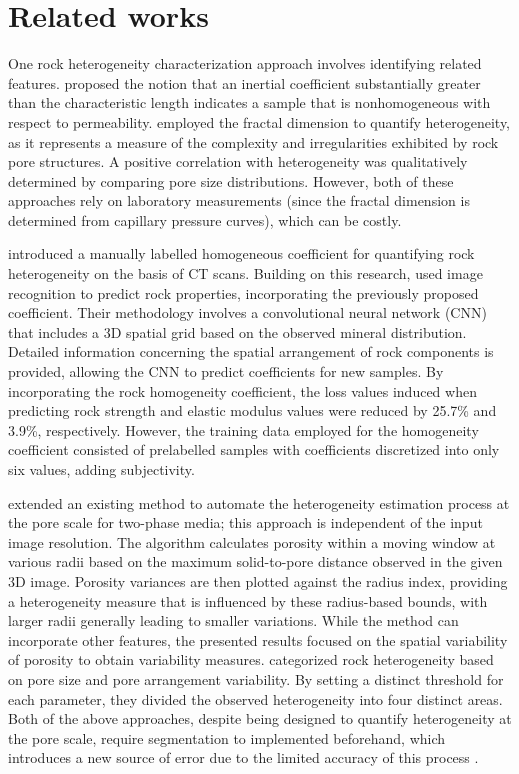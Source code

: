 \section{Related works}
\label{sec_related_works}

One rock heterogeneity characterization approach involves identifying related features. \citet{jones1987using} proposed the notion that an inertial coefficient substantially greater than the characteristic length indicates a sample that is nonhomogeneous with respect to permeability. \citet{li2004characterization} employed the fractal dimension to quantify heterogeneity, as it represents a measure of the complexity and irregularities exhibited by rock pore structures. A positive correlation with heterogeneity was qualitatively determined by comparing pore size distributions. However, both of these approaches rely on laboratory measurements (since the fractal dimension is determined from capillary pressure curves), which can be costly.

\citet{lin2021prediction} introduced a manually labelled homogeneous coefficient for quantifying rock heterogeneity on the basis of CT scans. Building on this research, \citet{tian2023quantification} used image recognition to predict rock properties, incorporating the previously proposed coefficient. Their methodology involves a convolutional neural network (CNN) that includes a 3D spatial grid based on the observed mineral distribution. Detailed information concerning the spatial arrangement of rock components is provided, allowing the CNN to predict coefficients for new samples. By incorporating the rock homogeneity coefficient, the loss values induced when predicting rock strength and elastic modulus values were reduced by 25.7\% and 3.9\%, respectively. However, the training data employed for the homogeneity coefficient consisted of prelabelled samples with coefficients discretized into only six values, adding subjectivity.

\citet{mohamed2023scale} extended an existing method to automate the heterogeneity estimation process at the pore scale for two-phase media; this approach is independent of the input image resolution. The algorithm calculates porosity within a moving window at various radii based on the maximum solid-to-pore distance observed in the given 3D image. Porosity variances are then plotted against the radius index, providing a heterogeneity measure that is influenced by these radius-based bounds, with larger radii generally leading to smaller variations. While the method can incorporate other features, the presented results focused on the spatial variability of porosity to obtain variability measures. \citet{yazynina2021new} categorized rock heterogeneity based on pore size and pore arrangement variability. By setting a distinct threshold for each parameter, they divided the observed heterogeneity into four distinct areas. Both of the above approaches, despite being designed to quantify heterogeneity at the pore scale, require segmentation to implemented beforehand, which introduces a new source of error due to the limited accuracy of this process \citep{xie2020sesv}.

